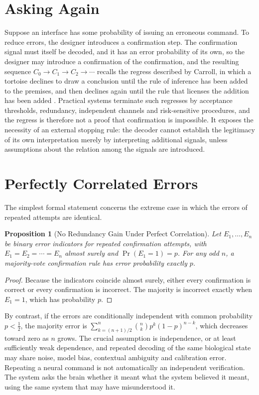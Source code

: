 \documentclass[11pt,twoside,openany]{book}
\newtheorem{proposition}[theorem]{Proposition}
\theoremstyle{definition}
\theoremstyle{remark}
\begin{document}
\section{Asking Again}

Suppose an interface has some probability of issuing an erroneous command. To reduce errors, the designer introduces a confirmation step. The confirmation signal must itself be decoded, and it has an error probability of its own, so the designer may introduce a confirmation of the confirmation, and the resulting sequence $C_0\to C_1\to C_2\to\cdots$ recalls the regress described by Carroll, in which a tortoise declines to draw a conclusion until the rule of inference has been added to the premises, and then declines again until the rule that licenses the addition has been added \cite{carroll1895}. Practical systems terminate such regresses by acceptance thresholds, redundancy, independent channels and risk-sensitive procedures, and the regress is therefore not a proof that confirmation is impossible. It exposes the necessity of an external stopping rule: the decoder cannot establish the legitimacy of its own interpretation merely by interpreting additional signals, unless assumptions about the relation among the signals are introduced.

\section{Perfectly Correlated Errors}

The simplest formal statement concerns the extreme case in which the errors of repeated attempts are identical.

\begin{proposition}[No Redundancy Gain Under Perfect Correlation]\label{prop:majority}
Let $E_1,\ldots,E_n$ be binary error indicators for repeated confirmation attempts, with $E_1=E_2=\cdots=E_n$ almost surely and $\Pr(E_1=1)=p$. For any odd $n$, a majority-vote confirmation rule has error probability exactly $p$.
\end{proposition}
\begin{proof}
Because the indicators coincide almost surely, either every confirmation is correct or every confirmation is incorrect. The majority is incorrect exactly when $E_1=1$, which has probability $p$.
\end{proof}

By contrast, if the errors are conditionally independent with common probability $p<\tfrac12$, the majority error is $\sum_{k=(n+1)/2}^{n}\binom{n}{k}p^{k}(1-p)^{n-k}$, which decreases toward zero as $n$ grows. The crucial assumption is independence, or at least sufficiently weak dependence, and repeated decoding of the same biological state may share noise, model bias, contextual ambiguity and calibration error. Repeating a neural command is not automatically an independent verification. The system asks the brain whether it meant what the system believed it meant, using the same system that may have misunderstood it.
\end{document}
